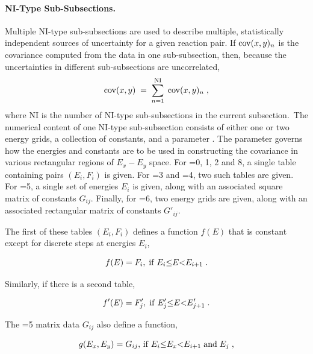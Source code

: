 \paragraph{NI-Type Sub-Subsections.} Multiple NI-type sub-subsections
are used to describe multiple, statistically independent sources of
uncertainty for a given reaction pair.  If $ {\rm cov}(x,y)_n$ is the
covariance computed from the data in one sub-subsection, then, because
the uncertainties in different sub-subsections are uncorrelated,
$$
{\rm cov}(x,y) \;= \; \sum^{{\rm NI}}_{n=1} \; {\rm cov}(x,y)_n \; ,
$$
\vspace{2 pt}
where NI is the number of NI-type sub-subsections in the current
subsection.\ The numerical content of one NI-type sub-subsection
consists of either one or two energy grids, a collection of constants,
and a parameter .  The parameter  governs how the
energies and constants are to be used in constructing the covariance in
various rectangular regions of $E_x {-}E_y$ space.  For =0, 1,
2 and 8, a single table containing pairs $(E_i,F_i)$ is
given.  For =3 and =4, two such tables are given.  For
=5,  a single set of energies $E_i$ is given, along with an
associated square matrix of constants $G_{ij}$.  Finally, for
=6, two energy grids are given, along with an associated
rectangular matrix of constants $G'_{ij}$.

The first of these tables $(E_i,F_i)$ defines a function $f(E)$
that is constant except for
discrete steps at energies $E_i$,

\begin{equation}
f(E) = F_i ,\;{\rm if}\; E_i{\leq} E{<}E_{i+1} \;.
\label{e12}
\end{equation}
\vspace{0.5 pt}

\noindent
Similarly, if there is a second table,

\begin{equation}
f'(E) = F'_j , \; {\rm if}\; E'_j{\leq}E{<}E'_{j+1} \;.
\end{equation}
\vspace{0.5 pt}

\noindent
The =5 matrix data $G_{ij}$ also define a function,

\begin{equation}
g(E_x,E_y) = G_{ij},\, {\rm{if}}\; E_i {\leq} E_x{<}E_{i+1} \;{\rm {and}}\; E_j
\; , \end{equation}


